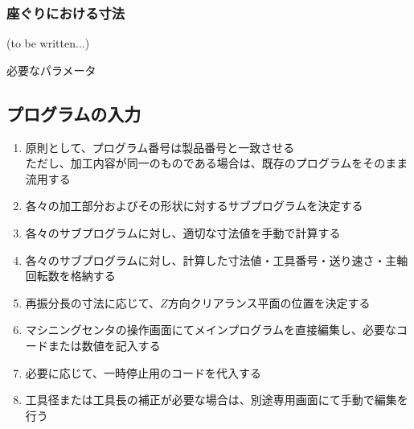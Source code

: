 \subsubsection{座ぐりにおける寸法\TBW}
(to be written...)
\begin{Parameter}{必要なパラメータ}
\end{Parameter}


\clearpage
\subsection{プログラムの入力}
\begin{enumerate}
\item 原則として、プログラム番号は製品番号と一致させる\\
ただし、加工内容が同一のものである場合は、既存のプログラムをそのまま流用する
\item 各々の加工部分およびその形状に対するサブプログラムを決定する
\item 各々のサブプログラムに対し、適切な寸法値を手動で計算する
\item 各々のサブプログラムに対し、計算した寸法値・工具番号・送り速さ・主軸回転数を格納する
\item {}再振分長の寸法に応じて、$Z$方向クリアランス平面の位置を決定する
\item マシニングセンタの操作画面にてメインプログラムを直接編集し、必要なコードまたは数値を記入する
\item 必要に応じて、一時停止用のコードを代入する
\item {}工具径または工具長の補正が必要な場合は、別途専用画面にて手動で編集を行う
\end{enumerate}


